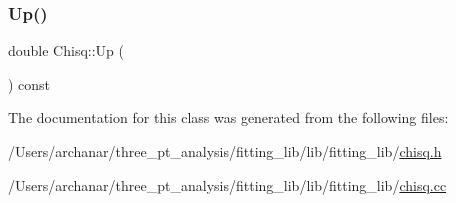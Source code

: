 \subsubsection{\texorpdfstring{Up()}{Up()}\hspace{0.1cm}{\footnotesize\ttfamily [2/2]}}
{\footnotesize\ttfamily double Chisq\+::\+Up (\begin{DoxyParamCaption}{ }\end{DoxyParamCaption}) const\hspace{0.3cm}{\ttfamily [inline]}}



The documentation for this class was generated from the following files\+:\begin{DoxyCompactItemize}
\item 
/\+Users/archanar/three\+\_\+pt\+\_\+analysis/fitting\+\_\+lib/lib/fitting\+\_\+lib/\mbox{\hyperlink{lib_2fitting__lib_2chisq_8h}{chisq.\+h}}\item 
/\+Users/archanar/three\+\_\+pt\+\_\+analysis/fitting\+\_\+lib/lib/fitting\+\_\+lib/\mbox{\hyperlink{chisq_8cc}{chisq.\+cc}}\end{DoxyCompactItemize}
